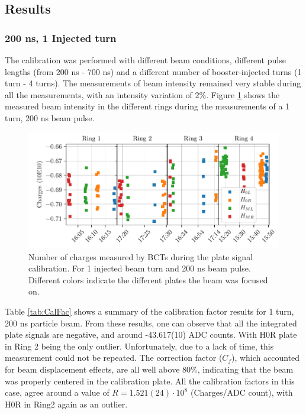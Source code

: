 \subsection{Results}
\label{sec:H0HmResults}

\subsubsection{200 ns, 1 Injected turn}

The calibration was performed with different beam conditions, different pulse lengths (from 200 ns - 700 ns) and a different number of booster-injected turns (1 turn - 4 turns). The measurements of beam intensity remained very stable during all the measurements, with an intensity variation of $2\%$. Figure \ref{fig:IntensityMeas} shows the measured beam intensity in the different rings during the measurements of a 1 turn, 200 ns beam pulse. 

\begin{figure}[h]
    \centering
    \includegraphics[width=1.0\columnwidth]{Figure_ResultsBCTStability/BctStability.pdf}
    \caption{ Number of charges measured by BCTs during the plate signal calibration. For 1 injected beam turn and 200 ns beam pulse. Different colors indicate the different plates the beam was focused on.}
    \label{fig:IntensityMeas}
\end{figure}

Table \ref{tab:CalFac} shows a summary of the calibration factor results for 1 turn, 200 ns particle beam. From these results, one can observe that all the integrated plate signals are negative, and around -43.617(10) ADC counts. With H0R plate in Ring 2 being the only outlier. Unfortunately, due to a lack of time, this measurement could not be repeated. The correction factor ($C_f$), which accounted for beam displacement effects, are all well above 80$\%$, indicating that the beam was properly centered in the calibration plate. All the calibration factors in this case, agree around a value of $R = 1.521(24)\cdot 10^8$ (Charges/ADC count), with H0R in Ring2 again as an outlier. 

